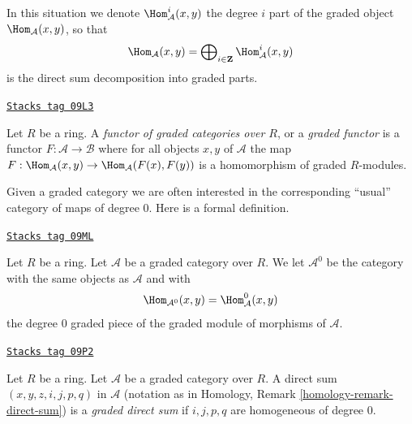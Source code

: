 In this situation we denote $\Hom_\mathcal{A}^i(x, y)$ the degree $i$
part of the graded object $\Hom_\mathcal{A}(x, y)$, so that
$$
\Hom_\mathcal{A}(x, y) =
\bigoplus\nolimits_{i \in \mathbf{Z}} \Hom_\mathcal{A}^i(x, y)
$$
is the direct sum decomposition into graded parts.

\begin{definition}
\label{dga-definition-functor-graded-categories}
\href{https://stacks.math.columbia.edu/tag/09L3}{\texttt{Stacks tag 09L3}}

Let $R$ be a ring. A {\it functor of graded categories over $R$}, or a
{\it graded functor}
is a functor $F : \mathcal{A} \to \mathcal{B}$ where for all objects
$x, y$ of $\mathcal{A}$ the map
$F : \Hom_\mathcal{A}(x, y) \to \Hom_\mathcal{A}(F(x), F(y))$
is a homomorphism of graded $R$-modules.
\end{definition}

Given a graded category we are often interested in the
corresponding ``usual'' category of maps of degree $0$.
Here is a formal definition.

\begin{definition}
\label{dga-definition-H0-of-graded-category}
\href{https://stacks.math.columbia.edu/tag/09ML}{\texttt{Stacks tag 09ML}}

Let $R$ be a ring. Let $\mathcal{A}$ be a graded category
over $R$. We let {\it $\mathcal{A}^0$} be the category with the
same objects as $\mathcal{A}$ and with
$$
\Hom_{\mathcal{A}^0}(x, y) = \Hom^0_\mathcal{A}(x, y)
$$
the degree $0$ graded piece of the graded module of morphisms of
$\mathcal{A}$.
\end{definition}

\begin{definition}
\label{dga-definition-graded-direct-sum}
\href{https://stacks.math.columbia.edu/tag/09P2}{\texttt{Stacks tag 09P2}}

Let $R$ be a ring. Let $\mathcal{A}$ be a graded category over $R$.
A direct sum $(x, y, z, i, j, p, q)$ in $\mathcal{A}$ (notation as in
Homology, Remark \ref{homology-remark-direct-sum})
is a {\it graded direct sum} if $i, j, p, q$ are homogeneous
of degree $0$.
\end{definition}

